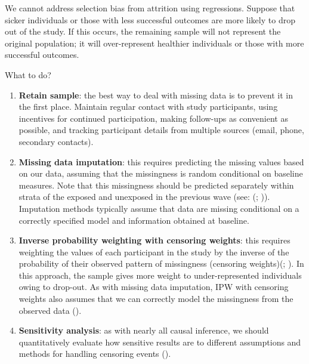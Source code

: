\documentclass[
  singlecolumn,
  9pt]{article}
\begin{document}
We cannot address selection bias from attrition using regressions.
Suppose that sicker individuals or those with less successful outcomes
are more likely to drop out of the study. If this occurs, the remaining
sample will not represent the original population; it will
over-represent healthier individuals or those with more successful
outcomes.

What to do?

\begin{enumerate}
\def\labelenumi{\arabic{enumi}.}
\item
  \textbf{Retain sample}: the best way to deal with missing data is to
  prevent it in the first place. Maintain regular contact with study
  participants, using incentives for continued participation, making
  follow-ups as convenient as possible, and tracking participant details
  from multiple sources (email, phone, secondary contacts).
\item
  \textbf{Missing data imputation}: this requires predicting the missing
  values based on our data, assuming that the missingness is random
  conditional on baseline measures. Note that this missingness should be
  predicted separately within strata of the exposed and unexposed in the
  previous wave (see: (; )).
  Imputation methods typically assume that data are missing conditional
  on a correctly specified model and information obtained at baseline.
\item
  \textbf{Inverse probability weighting with censoring weights}: this
  requires weighting the values of each participant in the study by the
  inverse of the probability of their observed pattern of missingness
  (censoring weights)(;
  ). In this approach, the
  sample gives more weight to under-represented individuals owing to
  drop-out. As with missing data imputation, IPW with censoring weights
  also assumes that we can correctly model the missingness from the
  observed data ().
\item
  \textbf{Sensitivity analysis}: as with nearly all causal inference, we
  should quantitatively evaluate how sensitive results are to different
  assumptions and methods for handling censoring events
  ().
\end{enumerate}
\end{document}

